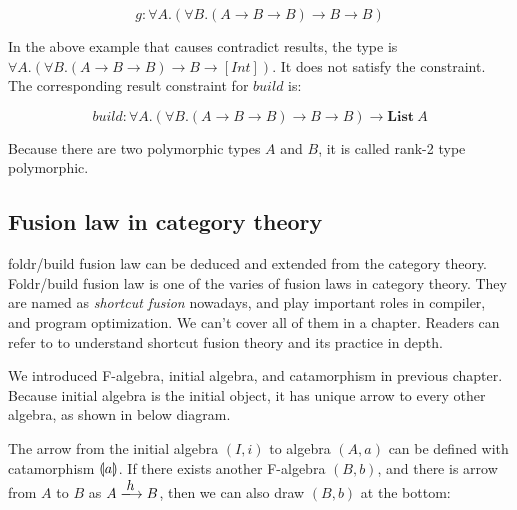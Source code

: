 \documentclass{article}
\begin{document}
\[
g : \forall A. (\forall B. (A \to B \to B) \to B \to B)
\]

In the above example that causes contradict results, the type is $\forall A. (\forall B. (A \to B \to B) \to B \to [Int])$. It does not satisfy the constraint. The corresponding result constraint for $build$ is:

\[
build : \forall A. (\forall B. (A \to B \to B) \to B \to B) \to \mathbf{List}\ A
\]

Because there are two polymorphic types $A$ and $B$, it is called rank-2 type polymorphic.

\subsection{Fusion law in category theory}
foldr/build fusion law can be deduced and extended from the category theory. Foldr/build fusion law is one of the varies of fusion laws in category theory. They are named as {\em shortcut fusion} nowadays, and play important roles in compiler, and program optimization. We can't cover all of them in a chapter. Readers can refer to \cite{Hinze-Harper-James-2010} to understand shortcut fusion theory and its practice in depth.

We introduced F-algebra, initial algebra, and catamorphism in previous chapter. Because initial algebra is the initial object, it has unique arrow to every other algebra, as shown in below diagram.

\begin{center}
\end{center}

The arrow from the initial algebra $(I, i)$ to algebra $(A, a)$ can be defined with catamorphism $\llparenthesis a \rrparenthesis$. If there exists another F-algebra $(B, b)$, and there is arrow from $A$ to $B$ as $A \arrowto{h} B$, then we can also draw $(B, b)$ at the bottom:
\end{document}
